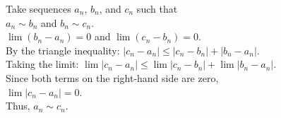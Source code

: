 \documentclass[preview]{standalone}
\begin{document}
\begin{center}
Take sequences $a_n$, $b_n$, and $c_n$ such that\\$a_n \sim b_n$ and $b_n \sim c_n$.\\$\lim (b_n - a_n) = 0$ and $\lim (c_n - b_n) = 0$.\\By the triangle inequality: $|c_n - a_n| \leq |c_n - b_n| + |b_n - a_n|$.\\Taking the limit: $\lim |c_n - a_n| \leq \lim |c_n - b_n| + \lim |b_n - a_n|$.\\Since both terms on the right-hand side are zero, \\$\lim |c_n - a_n| = 0$.\\Thus, $a_n \sim c_n$.
\end{center}
\end{document}

